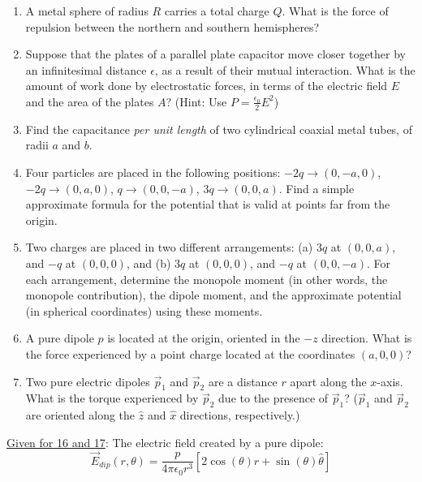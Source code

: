 \documentclass[12pt]{article}
\begin{document}
\begin{enumerate}
    \item A metal sphere of radius $R$ carries a total charge $Q$. What is the force of repulsion between the northern and southern hemispheres?
    
    \item Suppose that the plates of a parallel plate capacitor move closer together by an infinitesimal distance $\epsilon$, as a result of their mutual interaction. What is the amount of work done by electrostatic forces, in terms of the electric field $E$ and the area of the plates $A$? (Hint: Use $P=\frac{\epsilon_0}{2}E^2$)

    \item Find the capacitance \textit{per unit length} of two cylindrical coaxial metal tubes, of radii $a$ and $b$.

    \item Four particles are placed in the following positions: $-2q \rightarrow (0, -a, 0)$, $-2q \rightarrow (0, a, 0)$, $q \rightarrow (0, 0, -a)$, $3q \rightarrow (0, 0, a)$. Find a simple approximate formula for the potential that is valid at points far from the origin.

    \item Two charges are placed in two different arrangements: (a) $3q$ at $(0,0,a)$, and $-q$ at $(0,0,0)$, and (b) $3q$ at $(0,0,0)$, and $-q$ at $(0,0,-a)$. For each arrangement, determine the monopole moment (in other words, the monopole contribution), the dipole moment, and the approximate potential (in spherical coordinates) using these moments.
    
    \item A pure dipole $p$ is located at the origin, oriented in the $-z$ direction. What is the force experienced by a point charge located at the coordinates $(a,0,0)$?

    \item Two pure electric dipoles $\vec{p}_1$ and $\vec{p}_2$ are a distance $r$ apart along the $x$-axis. What is the torque experienced by $\vec{p}_2$ due to the presence of $\vec{p}_1$? ($\vec{p}_1$ and $\vec{p}_2$ are oriented along the $\hat{z}$ and $\hat{x}$ directions, respectively.)

\end{enumerate}

\underline{Given for 16 and 17}: The electric field created by a pure dipole:
\begin{equation*}
    \vec{E}_{dip}(r,\theta) = \frac{p}{4\pi\epsilon_0 r^3}\left[2\cos{\left(\theta\right)}\hat{r} + \sin{\left(\theta\right)}\hat{\theta}\right]
\end{equation*}
\end{document}
